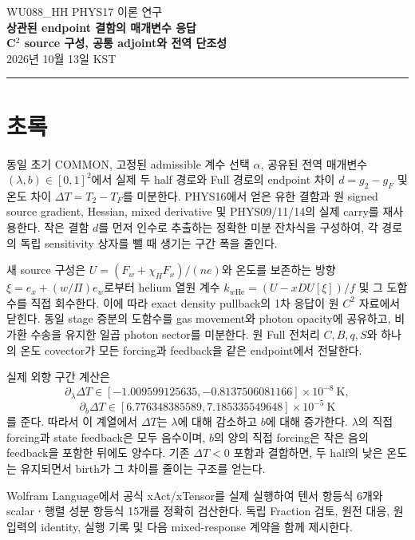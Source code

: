 


\begin{center}
{\color{MidnightBlue}\sffamily\large WU088\_HH \quad PHYS17 이론 연구}\\[5mm]
{\LARGE\bfseries 상관된 endpoint 결함의 매개변수 응답}\\[3mm]
{\Large\bfseries C$^2$ source 구성, 공통 adjoint와 전역 단조성}\\[4mm]
{\large 2026년 10월 13일 KST}
\end{center}
\vspace{2mm}\noindent\rule{\textwidth}{0.6pt}
\section*{초록}
동일 초기 COMMON, 고정된 admissible 계수 선택 $\alpha$, 공유된 전역 매개변수 $(\lambda,b)\in[0,1]^2$에서 실제 두 half 경로와 Full 경로의 endpoint 차이 $d=g_2-g_F$ 및 온도 차이 $\Delta T=T_2-T_F$를 미분한다. PHYS16에서 얻은 유한 결함과 원 signed source gradient, Hessian, mixed derivative 및 PHYS09/11/14의 실제 carry를 재사용한다. 작은 결함 $d$를 먼저 인수로 추출하는 정확한 미분 잔차식을 구성하여, 각 경로의 독립 sensitivity 상자를 뺄 때 생기는 구간 폭을 줄인다.

새 source 구성은 $U=(F_w+\chi_HF_x)/(ne)$와 온도를 보존하는 방향 $\xi=e_x+(w/\Pi)e_w$로부터 helium 열원 계수 $k_{w\mathrm{He}}=(U-xDU[\xi])/f$ 및 그 도함수를 직접 회수한다. 이에 따라 exact density pullback의 1차 응답이 원 $C^2$ 자료에서 닫힌다. 동일 stage 증분의 도함수를 gas movement와 photon opacity에 공유하고, 비가환 수송을 유지한 일곱 photon sector를 미분한다. 원 Full 전처리 $C,B,q,S$와 하나의 온도 covector가 모든 forcing과 feedback을 같은 endpoint에서 전달한다.

실제 외향 구간 계산은
\[
\partial_\lambda\Delta T\in[-1.009599125635,-0.8137506081166]\times10^{-8}\ \mathrm K,
\]
\[
\partial_b\Delta T\in[6.776348385589,7.185335549648]\times10^{-5}\ \mathrm K
\]
를 준다. 따라서 이 계열에서 $\Delta T$는 $\lambda$에 대해 감소하고 $b$에 대해 증가한다. $\lambda$의 직접 forcing과 state feedback은 모두 음수이며, $b$의 양의 직접 forcing은 작은 음의 feedback을 포함한 뒤에도 양수다. 기존 $\Delta T<0$ 포함과 결합하면, 두 half의 낮은 온도는 유지되면서 birth가 그 차이를 줄이는 구조를 얻는다.

Wolfram Language에서 공식 xAct/xTensor를 실제 실행하여 텐서 항등식 6개와 scalarㆍ행렬 성분 항등식 15개를 정확히 검산한다. 독립 Fraction 검토, 원전 대응, 원 입력의 identity, 실행 기록 및 다음 mixed-response 계약을 함께 제시한다.\cite{Neumaier1989Sensitivity,Rump1990Sensitivity,MargossianBetancourt2022Implicit,phys16,app17}

